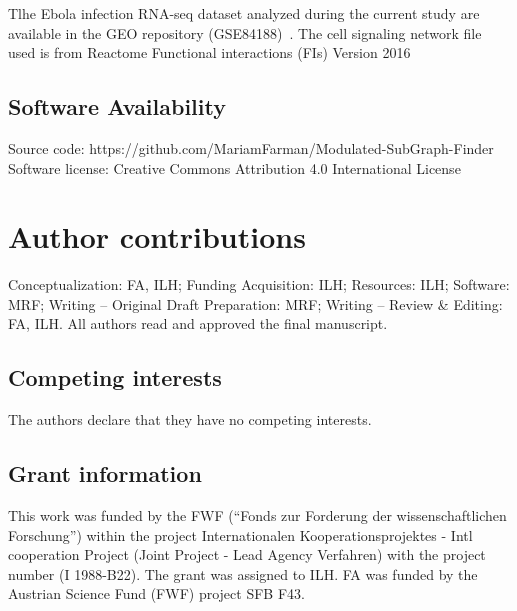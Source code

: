 \documentclass[10pt,a4paper,twocolumn]{article}
\begin{document}
Tlhe Ebola infection RNA-seq dataset analyzed during the current study are
available in the GEO repository (GSE84188)~\cite{Olejnik}. The cell
signaling network file used is from Reactome Functional interactions (FIs)
Version 2016~\cite{Cytokegg}

\subsection*{Software Availability}

Source code:
https://github.com/MariamFarman/Modulated-SubGraph-Finder \newline Software
license: Creative Commons Attribution 4.0 International License

\section*{Author contributions}
Conceptualization: FA, ILH; Funding Acquisition: ILH; Resources: ILH;
Software: MRF; Writing – Original Draft Preparation: MRF; Writing – Review
\& Editing: FA, ILH. All authors read and approved the final manuscript.

\subsection*{Competing interests}

The authors declare that they have no competing interests.

\subsection*{Grant information}

This work was funded by the FWF (“Fonds zur Forderung der
wissenschaftlichen Forschung”) within the project Internationalen
Kooperationsprojektes - Intl cooperation Project (Joint Project - Lead
Agency Verfahren) with the project number (I 1988-B22). The grant was
assigned to ILH. FA was funded by the Austrian Science Fund (FWF) project
SFB F43.


{\small
}

\bigskip



\begin{figure}
	\centering

\end{figure}
\end{document}
